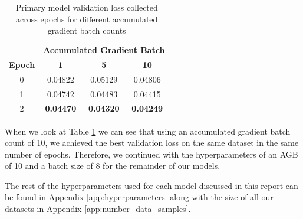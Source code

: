 \begin{table}[ht]
    \centering
    \begin{tabular}{cccc}
        \toprule
        \multicolumn{1}{c}{}             & \multicolumn{3}{c}{\textbf{Accumulated Gradient Batch}}                                       \\
        \cmidrule{2-4}
        \multirow{-2}{*}{\textbf{Epoch}} & \textbf{1}                                              & \textbf{5}       & \textbf{10}      \\
        \midrule
        0                                & 0.04822                                                 & 0.05129          & 0.04806          \\
        1                                & 0.04742                                                 & 0.04483          & 0.04415          \\
        2                                & \textbf{0.04470}                                        & \textbf{0.04320} & \textbf{0.04249} \\
        \bottomrule
    \end{tabular}
    \vspace{5pt}
    \caption{Primary model validation loss collected across epochs for different accumulated gradient batch counts}
    \label{tab:agb_val_loss}
\end{table}

When we look at Table \ref{tab:agb_val_loss} we can see that using an accumulated gradient batch count of 10, we achieved the best validation loss on the same dataset in the same number of epochs. Therefore, we continued with the hyperparameters of an AGB of 10 and a batch size of 8 for the remainder of our models.

The rest of the hyperparameters used for each model discussed in this report can be found in Appendix \ref{app:hyperparameters} along with the size of all our datasets in Appendix \ref{app:number_data_samples}.